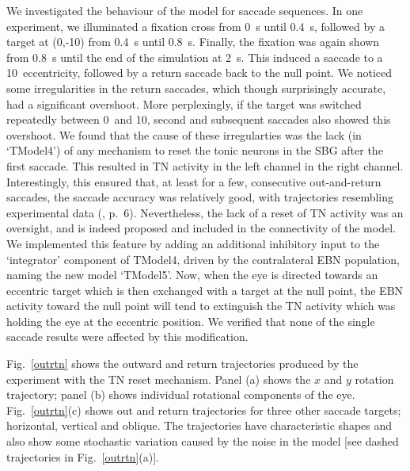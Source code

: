 \documentclass{frontiersSCNS}
\begin{document}
We investigated the behaviour of the model for saccade sequences.  In
one experiment, we illuminated a fixation cross from 0~s until 0.4~s,
followed by a target at (0,-10\dg) from 0.4~s until 0.8~s. Finally,
the fixation was again shown from 0.8~s until the end of the
simulation at 2~s. This induced a saccade to a 10\dg~eccentricity,
followed by a return saccade back to the null point. We noticed some
irregularities in the return saccades, which though surprisingly
accurate, had a significant overshoot.  More perplexingly, if the
target was switched repeatedly between 0\dg~and 10\dg, second and
subsequent  saccades also showed this overshoot. We found
that the cause of these irregularties was the lack (in `TModel4') of
any mechanism to reset the tonic neurons in the SBG after the first
saccade. This resulted in TN activity in the left channel 
in the right channel. Interestingly, this ensured that, at least for a
few, consecutive out-and-return saccades, the saccade accuracy was
relatively good, with trajectories resembling experimental data
(\cite{bahill_trajectories_1979}, p.~6). %
Nevertheless, the lack of a reset of TN activity was an oversight, and
is indeed proposed and included in the connectivity of the
\cite{gancarz_neural_1998} model. We implemented this feature by adding an
additional inhibitory input to the `integrator' component of TModel4,
driven by the contralateral EBN population, naming the new model
`TModel5'.  Now, when the eye is directed towards an eccentric target
which is then exchanged with a target at the null point, the EBN
activity toward the null point will tend to extinguish the TN activity
which was holding the eye at the eccentric position.  We verified that
none of the single saccade results were affected by this modification.

Fig.~\ref{outrtn} shows the outward and return trajectories produced
by the experiment with the TN reset mechanism. Panel (a) shows the $x$
and $y$ rotation trajectory; panel (b) shows individual rotational
components of the eye. Fig.~\ref{outrtn}(c) shows out and return
trajectories for three other saccade targets; horizontal, vertical and
oblique. The trajectories have characteristic shapes and also show
some stochastic variation caused by the noise in the model [see dashed
trajectories in Fig.~\ref{outrtn}(a)].
\end{document}

